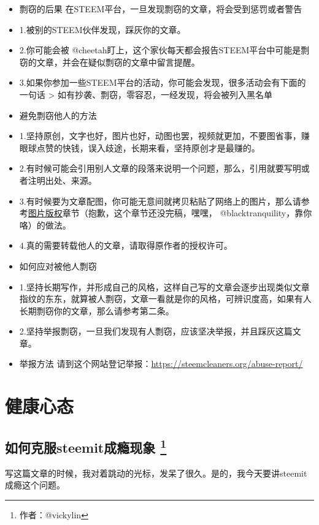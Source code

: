 \documentclass[]{ctexbook}
\begin{document}
\begin{itemize}
\item
  剽窃的后果
  在STEEM平台，一旦发现剽窃的文章，将会受到惩罚或者警告
\item
  1.被别的STEEM伙伴发现，踩灰你的文章。
\item
  2.你可能会被 @cheetah盯上，这个家伙每天都会报告STEEM平台中可能是剽窃的文章，并会在疑似剽窃的文章中留言提醒。
\item
  3.如果你参加一些STEEM平台的活动，你可能会发现，很多活动会有下面的一句话
  \textgreater{} 如有抄袭、剽窃，零容忍，一经发现，将会被列入黑名单
\item
  避免剽窃他人的方法
\item
  1.坚持原创，文字也好，图片也好，动图也罢，视频就更加，不要图省事，赚眼球点赞的快钱，误入歧途，长期来看，坚持原创才是最赚的。
\item
  2.有时候可能会引用别人文章的段落来说明一个问题，那么，引用就要写明或者注明出处、来源。
\item
  3.有时候要为文章配图，你可能无意间就拷贝粘贴了网络上的图片，那么请参考\protect\hyperlink{tpbq}{图片版权}章节（抱歉，这个章节还没完稿，嘿嘿， @blacktranquility，靠你咯）的做法。
\item
  4.真的需要转载他人的文章，请取得原作者的授权许可。
\item
  如何应对被他人剽窃
\item
  1.坚持长期写作，并形成自己的风格，这样自己写的文章会逐步出现类似文章指纹的东东，就算被人剽窃，文章一看就是你的风格，可辨识度高，如果有人长期剽窃你的文章，那么请参考第二条。
\item
  2.坚持举报剽窃，一旦我们发现有人剽窃，应该坚决举报，并且踩灰这篇文章。
\item
  举报方法
  请到这个网站登记举报：\url{https://steemcleaners.org/abuse-report/}
\end{itemize}

\hypertarget{jkxt}{%
\section{健康心态}\label{jkxt}}

\hypertarget{addiction}{%
\subsection[如何克服steemit成瘾现象 ]{\texorpdfstring{如何克服steemit成瘾现象 \footnote{作者：@vickylin}}{如何克服steemit成瘾现象 }}\label{addiction}}

写这篇文章的时候，我对着跳动的光标，发呆了很久。是的，我今天要讲steemit成瘾这个问题。
\end{document}
